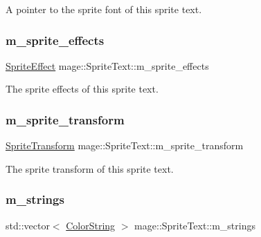 A pointer to the sprite font of this sprite text. \hypertarget{classmage_1_1_sprite_text_acc64029be6634cac0651ceaaa0f84a3b}{}\label{classmage_1_1_sprite_text_acc64029be6634cac0651ceaaa0f84a3b} 
\subsubsection{\texorpdfstring{m\+\_\+sprite\+\_\+effects}{m\_sprite\_effects}}
{\footnotesize\ttfamily \hyperlink{namespacemage_ad62ebdf0e7aae0caf1535a4ea3f056ea}{Sprite\+Effect} mage\+::\+Sprite\+Text\+::m\+\_\+sprite\+\_\+effects\hspace{0.3cm}{\ttfamily [private]}}

The sprite effects of this sprite text. \hypertarget{classmage_1_1_sprite_text_ade755cb73d8db4f388063cda1a351c50}{}\label{classmage_1_1_sprite_text_ade755cb73d8db4f388063cda1a351c50} 
\subsubsection{\texorpdfstring{m\+\_\+sprite\+\_\+transform}{m\_sprite\_transform}}
{\footnotesize\ttfamily \hyperlink{classmage_1_1_sprite_transform}{Sprite\+Transform} mage\+::\+Sprite\+Text\+::m\+\_\+sprite\+\_\+transform\hspace{0.3cm}{\ttfamily [private]}}

The sprite transform of this sprite text. \hypertarget{classmage_1_1_sprite_text_aadda462c0b67282ef86a7cb2b235367c}{}\label{classmage_1_1_sprite_text_aadda462c0b67282ef86a7cb2b235367c} 
\subsubsection{\texorpdfstring{m\+\_\+strings}{m\_strings}}
{\footnotesize\ttfamily std\+::vector$<$ \hyperlink{classmage_1_1_color_string}{Color\+String} $>$ mage\+::\+Sprite\+Text\+::m\+\_\+strings\hspace{0.3cm}{\ttfamily [private]}}

